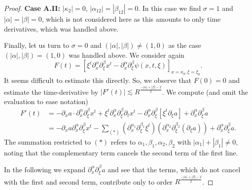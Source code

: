 \documentclass[10pt,a4paper]{amsart}
\begin{document}
\begin{proof}
\textbf{Case A.II:} $|\kappa_2| = 0$, $|\alpha_{12}| = |\beta_{12}| = 0$. In this case we find $\sigma = 1$ and $|\alpha| = |\beta| = 0$, which is not considered here as this amounts to only time derivatives, which was handled above.
%
\smallskip

Finally, let us turn to $\sigma = 0$ and $(|\alpha|,|\beta|) \neq (1,0)$ as the case $(|\alpha|,|\beta|) = (1,0)$ was handled above.
We consider again
\begin{equation*}
F(t) = [ \xi^t \partial_x^{\alpha} \partial_{\xi}^{\beta} x^t - \partial_x^{\alpha} \partial_{\xi}^{\beta} \psi(x,t,\xi) ]_{x=x_0,\xi = \xi_0}.
\end{equation*}
It seems difficult to estimate this directly. So, we observe that $F(0)= 0$ and estimate the time-derivative by $|F'(t)| \lesssim R^{\frac{-|\alpha|+|\beta|-2}{2}}$.
We compute (and omit the evaluation to ease notation)
\begin{equation}
\label{eq:FPrime}
\begin{split}
F'(t) &= - \partial_x a \cdot \partial_x^{\alpha} \partial_{\xi}^{\beta} x^t + \xi^t \partial_x^{\alpha} \partial_{\xi}^{\beta} \partial_t x^t - \partial_x^{\alpha} \partial_{\xi}^{\beta} [ \xi^t \partial_{\xi} a] + \partial_x^{\alpha} \partial_{\xi}^{\beta} a \\
&= - \partial_x a \partial_x^{\alpha} \partial_{\xi}^{\beta} x^t - \sum_{(*)} (\partial_x^{\alpha_1} \partial_{\xi}^{\beta_1} \xi^t) (\partial_x^{\alpha_2} \partial_{\xi}^{\beta_2} (\partial_{\xi} a)) + \partial_x^{\alpha} \partial_{\xi}^{\beta} a.
\end{split}
\end{equation}
The summation restricted to $(*)$ refers to $\alpha_1,\beta_1,\alpha_2,\beta_2$ with $|\alpha_1|+|\beta_1| \neq 0$, noting that the complementary term cancels the second term of the first line.

In the following we expand $\partial_x^{\alpha} \partial_{\xi}^{\beta} a$ and see that the terms, which do not cancel with the first and second term, contribute only to order $R^{\frac{-|\alpha|+|\beta|-2}{2}}$.


\end{proof}
\end{document}
